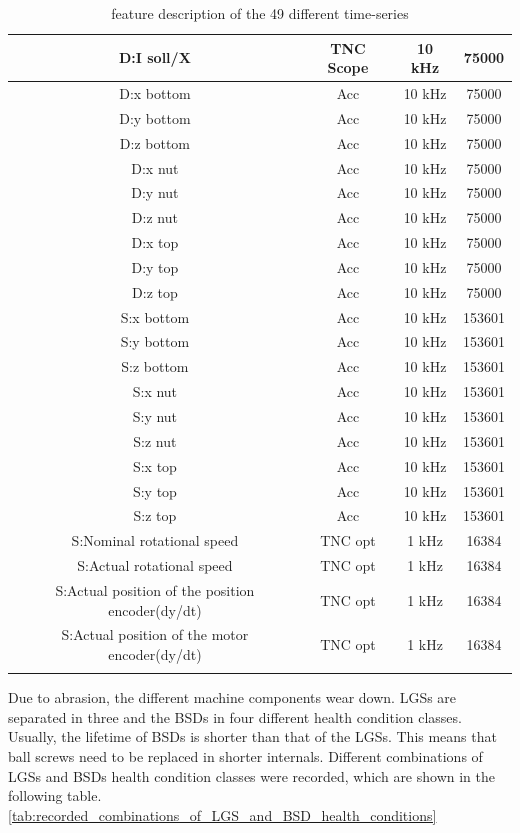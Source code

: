\begin{center}
\begin{longtable}{||c c c c||}
 D:I soll/X & TNC Scope & 10 kHz & 75000 \\ 
 \hline
 D:x bottom & Acc & 10 kHz & 75000 \\ 
  \hline
 D:y bottom & Acc & 10 kHz & 75000 \\ 
 \hline
 D:z bottom & Acc & 10 kHz & 75000 \\ 
 \hline
 D:x nut & Acc & 10 kHz & 75000 \\ 
 \hline
 D:y nut & Acc & 10 kHz & 75000 \\ 
 \hline
 D:z nut & Acc & 10 kHz & 75000 \\ 
 \hline
 D:x top & Acc & 10 kHz & 75000 \\
  \hline
 D:y top & Acc & 10 kHz & 75000 \\ 
 \hline
 D:z top & Acc & 10 kHz & 75000 \\ 
 \hline
 S:x bottom & Acc & 10 kHz & 153601 \\ 
 \hline
 S:y bottom & Acc & 10 kHz & 153601 \\ 
 \hline
 S:z bottom & Acc & 10 kHz & 153601 \\ 
 \hline
 S:x nut & Acc & 10 kHz & 153601 \\ 
  \hline
 S:y nut & Acc & 10 kHz & 153601 \\ 
 \hline
 S:z nut & Acc & 10 kHz & 153601 \\ 
 \hline
 S:x top & Acc & 10 kHz & 153601 \\ 
 \hline
 S:y top & Acc & 10 kHz & 153601 \\ 
 \hline
 S:z top & Acc & 10 kHz & 153601 \\ 
 \hline
 S:Nominal rotational speed & TNC opt & 1 kHz & 16384 \\
  \hline
 S:Actual rotational speed & TNC opt & 1 kHz & 16384 \\ 
 \hline
 S:Actual position of the position encoder(dy/dt) & TNC opt & 1 kHz & 16384 \\ 
 \hline
 S:Actual position of the motor encoder(dy/dt)  & TNC opt & 1 kHz & 16384  \\ [1ex] 
 \hline
\caption {feature description of the 49 different time-series}
\label {tab:description_of_the_49_recorded_features}
\end{longtable}
\end{center}

Due to abrasion, the different machine components wear down. LGSs are separated in three and the BSDs in four different health condition classes. Usually, the lifetime of BSDs is shorter than that of the LGSs. This means that ball screws need to be replaced in shorter internals. Different combinations of LGSs and BSDs health condition classes were recorded, which are shown in the following table. \ref{tab:recorded_combinations_of_LGS_and_BSD_health_conditions}

